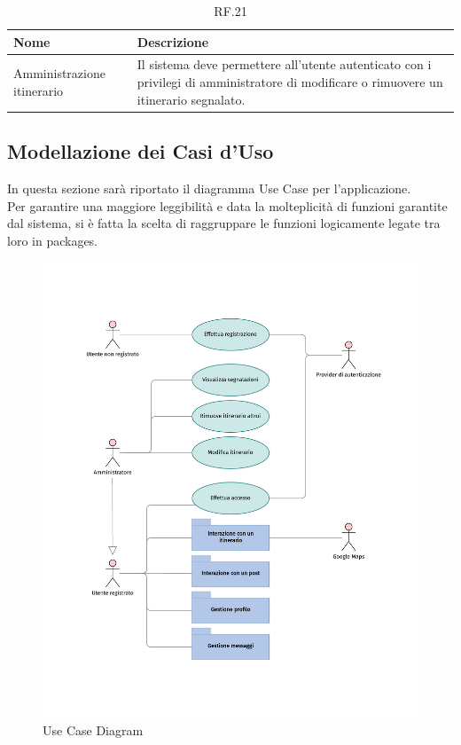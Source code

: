 \documentclass{natourDoc}
\begin{document}
	\begin{table}[H]
		\centering
		\begin{tabular}{ |p{5cm}|p{10.3cm}| }
			\hline
			\rowcolor{PineGreen!70}
			\textbf{Nome} & \textbf{Descrizione} \\
			\hline
			Amministrazione itinerario & Il sistema deve permettere all'utente autenticato con i privilegi di amministratore di modificare o
			rimuovere un itinerario segnalato.\\
			\hline
		\end{tabular}
		\caption{RF.21}
		\label{table:21}
	\end{table}

	\newpage
	\subsection{Modellazione dei Casi d'Uso}
	In questa sezione sarà riportato il diagramma Use Case per l'applicazione.\\
	Per garantire una maggiore leggibilità e data la molteplicità di funzioni garantite
	dal sistema, si è fatta la scelta di raggruppare le funzioni logicamente legate 
	tra loro in packages.

	\begin{figure}[!htbp]
		\centering
		\includegraphics[width=\textwidth, page=1]{./diagrams/useCase.pdf}
		\caption{Use Case Diagram}
	\end{figure}
	\FloatBarrier
\end{document}

